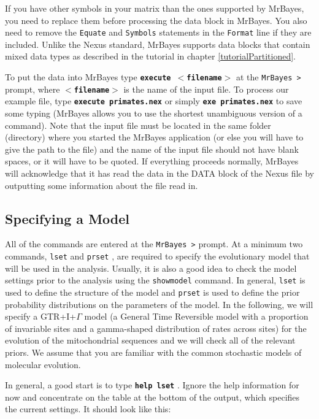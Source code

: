 \documentclass[12pt]{book}
\newcommand{\ttt}[1]{\texttt{#1} }
\newcommand{\tb}[1]{\ttt{\textbf{#1}} }
\begin{document}
If you have other symbols in your matrix than the ones supported by MrBayes, you need to replace
them before processing the data block in MrBayes. You also need to remove the \ttt{Equate} and
\ttt{Symbols} statements in the \ttt{Format} line if they are included. Unlike the Nexus standard, MrBayes
supports data blocks that contain mixed data types as described in the tutorial in chapter
\ref{tutorialPartitioned}.

To put the data into MrBayes type \tb{execute $<$filename$>$} at the \ttt{MrBayes >} prompt,
where \tb{$<$filename$>$} is the name of the input file. To process our example file, type
\tb{execute primates.nex} or simply \tb{exe primates.nex} to save some typing (MrBayes
allows you to use the shortest unambiguous version of a command). Note that the input file must be
located in the same folder (directory) where you started the MrBayes application (or else you will
have to give the path to the file) and the name of the input file should not have blank spaces, or
it will have to be quoted. If everything proceeds normally, MrBayes will acknowledge that it has
read the data in the DATA block of the Nexus file by outputting some information about the file
read in.

\subsection{Specifying a Model}
All of the commands are entered at the \ttt{MrBayes >} prompt. At a minimum two commands,
\ttt{lset} and \ttt{prset}, are required to specify the evolutionary model that will be used
in the analysis. Usually, it is also a good idea to check the model settings prior to the analysis
using the \ttt{showmodel} command. In general, \ttt{lset} is used to define the structure of
the model and \ttt{prset} is used to define the prior probability distributions on the
parameters of the model. In the following, we will specify a GTR+I+$\Gamma$ model (a General
Time Reversible model with a proportion of invariable sites and a gamma-shaped distribution of
rates across sites) for the evolution of the mitochondrial sequences and we will check all of the
relevant priors. We assume that you are familiar with the common stochastic models of molecular
evolution.

In general, a good start is to type \tb{help lset}. Ignore the help information for now and
concentrate on the table at the bottom of the output, which specifies the current settings. It
should look like this:
\end{document}
